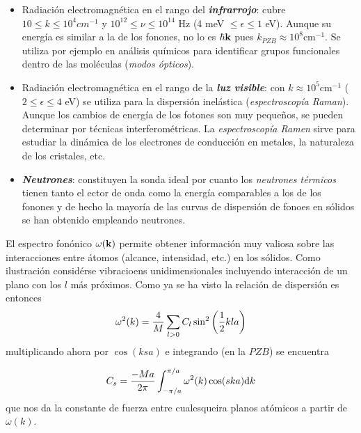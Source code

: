 \begin{itemize}
    \item Radiación electromagnética en el rango del \textbf{\textit{infrarrojo}}: cubre $10\le k \le 10^4 \unit{cm^{-1}}$ y $10^{12} \leq \nu \leq 10^{14}$ Hz (4 meV $\leq \epsilon \leq 1$ eV). Aunque su energía es similar a la de los fonones, no lo es $\hbar \mathbf{k}$ pues $k_{PZB} \approx 10^8  \unit{\cm^{-1}}$. Se utiliza por ejemplo en análisis químicos para identificar grupos funcionales dentro de las moléculas (\textit{modos ópticos}).
    \item Radiación electromagnética en el rango de la \textbf{\textit{luz visible}}: con $k\approx 10^5 \unit{\cm^{-1}}$ ($2\leq \epsilon \leq 4$ eV) se utiliza para la dispersión inelástica (\textit{espectroscopía Raman}). Aunque los cambios de energía de los fotones son muy pequeños, se pueden determinar por técnicas interferométricas. La \textit{espectroscopía Ramen} sirve para estudiar la dinámica de los electrones de conducción en metales, la naturaleza de los cristales, etc.
    \item \textbf{\textit{Neutrones}}: constituyen la sonda ideal por cuanto los \textit{neutrones térmicos} tienen tanto el ector de onda como la energía comparables a los de los fonones y de hecho la mayoría de las curvas de dispersión de fonoes en sólidos se han obtenido empleando neutrones.
\end{itemize}


El espectro fonónico $\omega (\mathbf{k})$ permite obtener información muy valiosa sobre las interacciones entre átomos (alcance, intensidad, etc.) en los sólidos. Como ilustración considérse vibracioens unidimensionales incluyendo interacción de un plano con los $l$ más próximos. Como ya se ha visto la relación de dispersión es entonces
\begin{equation}
    \omega^2 (k) = \frac{4}{M} \sum_{l>0} C_l \sin^2 \left( \frac{1}{2} k la \right)
\end{equation}
multiplicando ahora por $\cos (ksa)$ e integrando (en la $PZB$) se encuentra

\begin{equation}
    C_s = \frac{-Ma}{2\pi} \int_{-\pi/a}^{\pi/a} \omega^2 (k) \cos (ska) \mathrm{d} k
\end{equation}
que nos da la constante de fuerza entre cualesqueira planos atómicos a partir de $\omega (k)$.

